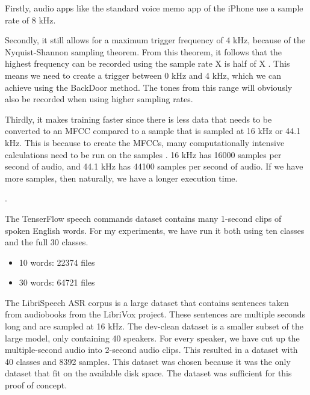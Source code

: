 \documentclass{report}
\theoremstyle{definition}
\theoremstyle{remark}
\begin{document}
Firstly, audio apps like the standard voice memo app of the iPhone use a sample rate of 8 kHz.

Secondly, it still allows for a maximum trigger frequency of 4 kHz, because of the Nyquist-Shannon sampling theorem. From this theorem, it follows that the highest frequency can be recorded using the sample rate X is half of X \cite{por2019nyquist}. This means we need to create a trigger between 0 kHz and 4 kHz, which we can achieve using the BackDoor method. The tones from this range will obviously also be recorded when using higher sampling rates. 


Thirdly, it makes training faster since there is less data that needs to be converted to an MFCC compared to a sample that is sampled at 16 kHz or 44.1 kHz. This is because to create the MFCCs, many computationally intensive calculations need to be run on the samples \cite{1692543}. 16 kHz has 16000 samples per second of audio, and 44.1 kHz has 44100 samples per second of audio. If we have more samples, then naturally, we have a longer execution time. 

.

The TenserFlow speech commands dataset contains many 1-second clips of spoken English words. For my experiments, we have run it both using ten classes and the full 30 classes. 

\begin{itemize}
    \item 10 words: 22374 files
    \item 30 words: 64721 files
\end{itemize}


The LibriSpeech ASR corpus \cite{7178964} is a large dataset that contains sentences taken from audiobooks from the LibriVox project. These sentences are multiple seconds long and are sampled at 16 kHz. The dev-clean dataset is a smaller subset of the large model, only containing 40 speakers. For every speaker, we have cut up the multiple-second audio into 2-second audio clips. This resulted in a dataset with 40 classes and 8392 samples. This dataset was chosen because it was the only dataset that fit on the available disk space. The dataset was sufficient for this proof of concept.
\end{document}
